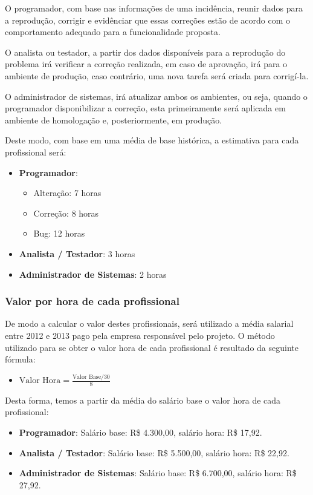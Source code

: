 \documentclass[11pt, a4paper]{article}
\begin{document}
O programador, com base nas informações de uma incidência, reunir dados para a reprodução, corrigir e evidênciar que essas correções estão de acordo com o comportamento adequado para a funcionalidade proposta.

O analista ou testador, a partir dos dados disponíveis para a reprodução do problema irá verificar a correção realizada, em caso de aprovação, irá para o ambiente de produção, caso contrário, uma nova tarefa será criada para corrigí-la.

O administrador de sistemas, irá atualizar ambos os ambientes, ou seja, quando o programador disponibilizar a correção, esta primeiramente será aplicada em ambiente de homologação e, posteriormente, em produção.

Deste modo, com base em uma média de base histórica, a estimativa para cada profissional será:

\begin{itemize}
	\item \textbf{Programador}: 
		\begin{itemize}
			\item Alteração: 7 horas
			\item Correção: 8 horas
			\item Bug: 12 horas
		\end{itemize}
	\item \textbf{Analista / Testador}: 3 horas
	\item \textbf{Administrador de Sistemas}: 2 horas
\end{itemize}

\subsubsection{Valor por hora de cada profissional}
De modo a calcular o valor destes profissionais, será utilizado a média salarial entre 2012 e 2013 pago pela empresa responsável pelo projeto. O método utilizado para se obter o valor hora de cada profissional é resultado da seguinte fórmula: 

\begin{itemize}
  \item[] \textbf{$\text{Valor Hora}=\frac{\text{Valor Base} / 30}{8}$}
\end{itemize}

Desta forma, temos a partir da média do salário base o valor hora de cada profissional:

\begin{itemize}
	\item \textbf{Programador}: Salário base: R\$ 4.300,00, salário hora: R\$ 17,92.
	\item \textbf{Analista / Testador}: Salário base: R\$ 5.500,00, salário hora: R\$ 22,92.
	\item \textbf{Administrador de Sistemas}: Salário base: R\$ 6.700,00, salário hora: R\$ 27,92.
\end{itemize}
\end{document}

